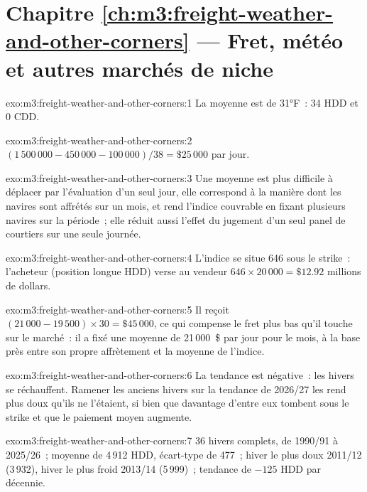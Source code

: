 \section*{Chapitre \ref{ch:m3:freight-weather-and-other-corners} --- Fret, météo et autres marchés de niche}

\begin{solution}{exo:m3:freight-weather-and-other-corners:1}
La moyenne est de 31°F~: 34 HDD et 0 CDD.
\end{solution}

\begin{solution}{exo:m3:freight-weather-and-other-corners:2}
$(1\,500\,000 - 450\,000 - 100\,000)/38 = \$25\,000$ par jour.
\end{solution}

\begin{solution}{exo:m3:freight-weather-and-other-corners:3}
Une moyenne est plus difficile à déplacer par l'évaluation d'un seul jour, elle correspond à la manière dont les navires sont affrétés sur un mois, et
rend l'indice couvrable en fixant plusieurs navires sur la période~; elle réduit aussi l'effet du jugement d'un seul
panel de courtiers sur une seule journée.
\end{solution}

\begin{solution}{exo:m3:freight-weather-and-other-corners:4}
L'indice se situe 646 sous le strike~: l'acheteur (position longue HDD) verse au vendeur $646 \times 20\,000 = \$12.92$
millions de dollars.
\end{solution}

\begin{solution}{exo:m3:freight-weather-and-other-corners:5}
Il reçoit $(21\,000 - 19\,500) \times 30 = \$45\,000$, ce qui compense le fret plus bas qu'il touche sur le marché~:
il a fixé une moyenne de 21\,000~\$ par jour pour le mois, à la base près entre son propre affrètement et la
moyenne de l'indice.
\end{solution}

\begin{solution}{exo:m3:freight-weather-and-other-corners:6}
La tendance est négative~: les hivers se réchauffent. Ramener les anciens hivers sur la tendance de 2026/27 les rend
plus doux qu'ils ne l'étaient, si bien que davantage d'entre eux tombent sous le strike et que le paiement moyen augmente.
\end{solution}

\begin{solution}{exo:m3:freight-weather-and-other-corners:7}
36 hivers complets, de 1990/91 à 2025/26~; moyenne de 4\,912 HDD, écart-type de 477~; hiver le plus doux 2011/12 (3\,932),
hiver le plus froid 2013/14 (5\,999)~; tendance de $-125$ HDD par décennie.
\end{solution}

